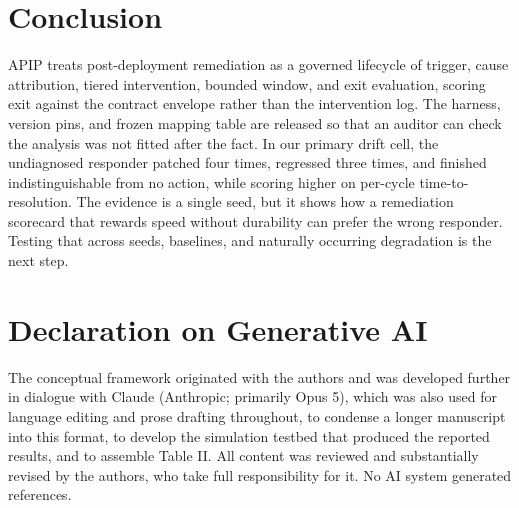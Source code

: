 \documentclass[conference]{IEEEtran}
\begin{document}
\section{Conclusion}

APIP treats post-deployment remediation as a governed lifecycle of trigger, cause attribution, tiered intervention, bounded window, and exit evaluation, scoring exit against the contract envelope rather than the intervention log. The harness, version pins, and frozen mapping table are released so that an auditor can check the analysis was not fitted after the fact. In our primary drift cell, the undiagnosed responder patched four times, regressed three times, and finished indistinguishable from no action, while scoring higher on per-cycle time-to-resolution. The evidence is a single seed, but it shows how a remediation scorecard that rewards speed without durability can prefer the wrong responder. Testing that across seeds, baselines, and naturally occurring degradation is the next step.

\section*{Declaration on Generative AI}

The conceptual framework originated with the authors and was developed further in dialogue with Claude (Anthropic; primarily Opus 5), which was also used for language editing and prose drafting throughout, to condense a longer manuscript into this format, to develop the simulation testbed that produced the reported results, and to assemble Table II. All content was reviewed and substantially revised by the authors, who take full responsibility for it. No AI system generated references.
\end{document}
